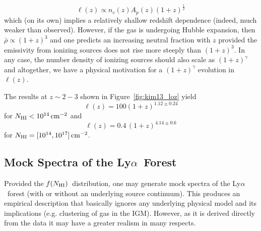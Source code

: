 \documentclass[graybox]{svmult}
\def\lya{Ly$\alpha$}
\def\ohf{\frac{1}{2}}
\newcommand{\mnhi}{N_{\rm HI}}
\newcommand{\nhi}{$\mnhi$}
\def\cm#1{\, {\rm cm^{#1}}}
\def\mfnhi{f(\mnhi)}
\def\fnhi{$\mfnhi$}
\begin{document}
\begin{equation}
\ell(z) \propto n_c(z) A_p(z) (1+z)^{\ohf}
\end{equation}
which (on its own) implies a relatively shallow
redshift dependence (indeed, much weaker than observed).
However, if the gas is undergoing Hubble expansion, then 
$\bar\rho \propto (1+z)^3$ and one predicts
an increasing neutral fraction with $z$ 
provided the emissivity from ionizing sources does
not rise more steeply than $(1+z)^3$.
In any case, the number density of ionizing sources
should also scale as $(1+z)^\gamma$
and altogether, we have a physical motivation for a $(1+z)^\gamma$
evolution in $\ell(z)$.

The results at $z \sim 2-3$ shown in Figure~\ref{fig:kim13_loz}
yield
\begin{equation}
\ell(z) = 100 (1+z)^{1.12 \pm 0.24}
\end{equation}
for $\mnhi < 10^{14} \cm{-2}$ and
\begin{equation}
\ell(z) = 0.4 \, (1+z)^{4.14 \pm 0.6}
\end{equation}
for $\mnhi = [10^{14}, 10^{17}] \cm{-2}$.


\subsection{Mock Spectra of the \lya\ Forest}
Provided the \fnhi\ distribution, one may generate mock
spectra of the \lya\ forest (with or without an underlying
source continuum).  This produces an empirical description
that basically ignores any underlying physical model
and its implications (e.g. clustering of gas in the IGM).
However, as it is derived directly from the data it may
have a greater realism in many respects.  
\end{document}
